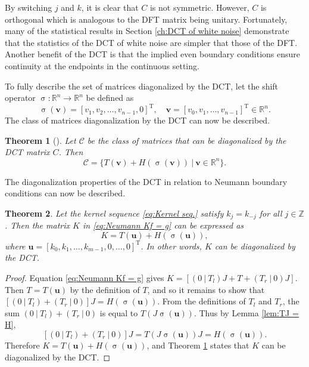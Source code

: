 \documentclass[12pt,notitlepage]{report}
\newcommand{\trans}{\mathrm{T}}	%
\DeclareMathOperator{\shift}{\sigma}	%
\newtheorem{theorem}{Theorem}[section]
\begin{document}
By switching $j$ and $k$, it is clear that $C$ is not symmetric. However, $C$ is orthogonal which is analogous to the DFT matrix being unitary. Fortunately, many of the statistical results in Section \ref{ch:DCT of white noise} demonstrate that the statistics of the DCT of white noise are simpler that those of the DFT. Another benefit of the DCT is that the implied even boundary conditions ensure continuity at the endpoints in the continuous setting. \par
To fully describe the set of matrices diagonalized by the DCT, let the shift operator $\shift: \mathbb{R}^n \rightarrow \mathbb{R}^n$ be defined as
\[\shift(\mathbf{v}) = [v_1,v_2,\ldots,v_{n-1},0]^\trans, \quad \mathbf{v} = [v_0,v_1,\ldots,v_{n-1}]^\trans \in \mathbb{R}^n.\] 
The class of matrices diagonalization by the DCT can now be described.
\begin{theorem}[{{\cite{ChanChanWong,KailathOlshevsky1996,Martucci1994,Sanchez_et_al}}}]
\label{thm:DCT Diagonalization}
Let $\mathcal{C}$ be the class of matrices that can be diagonalized by the DCT matrix $C$. Then
\[\mathcal{C} = \{T(\mathbf{v}) + H\left(\shift(\mathbf{v})\right) ~|~ \mathbf{v} \in \mathbb{R}^n\}.\]
\end{theorem}
The diagonalization properties of the DCT in relation to Neumann boundary conditions can now be described.
\begin{theorem}
\label{thm:Neumann Diagonalization}
Let the kernel sequence \eqref{eq:Kernel seq.} satisfy $k_j = k_{-j}$ for all $j \in \mathbb{Z}$. Then the matrix $K$ in \eqref{eq:Neumann Kf = g} can be expressed as
\[K = T(\mathbf{u}) + H\left(\shift(\mathbf{u})\right),\]
where $\mathbf{u} = [k_0,k_1,\ldots,k_{m-1},0,\ldots,0]^\trans$. In other words, $K$ can be diagonalized by the DCT.
\end{theorem}
\begin{proof}
Equation \eqref{eq:Neumann Kf = g} gives $K = [(0~|~T_{l})J + T + (T_{r}~|~0)J]$. Then $T = T(\mathbf{u})$ by the definition of $T$, and so it remains to show that $[(0~|~T_{l}) + (T_{r}~|~0)]J = H\left(\shift(\mathbf{u})\right)$. From the definitions of $T_{l}$ and $T_{r}$, the sum $(0~|~T_{l}) + (T_{r}~|~0)$ is equal to $T\left(J\shift(\mathbf{u})\right)$. Thus by Lemma \ref{lem:TJ = H},
\[[(0~|~T_{l}) + (T_{r}~|~0)]J = T\left(J\shift(\mathbf{u})\right)J = H\left(\shift(\mathbf{u})\right).\]
Therefore $K = T(\mathbf{u}) + H\left(\shift(\mathbf{u})\right)$, and Theorem \ref{thm:DCT Diagonalization} states that $K$ can be diagonalized by the DCT. 
\end{proof}
\end{document}
